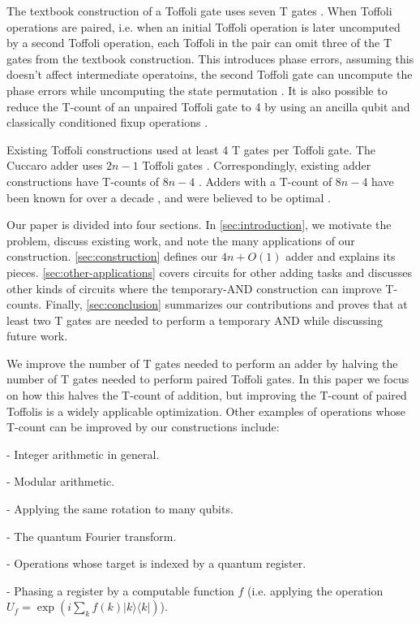 \documentclass[twocolumn,longbibliography]{quantumarticle-customized}
\begin{document}
The textbook construction of a Toffoli gate uses seven T gates \cite{Nielsen2009}.
When Toffoli operations are paired, i.e. when an initial Toffoli operation is later uncomputed by a second Toffoli operation, each Toffoli in the pair can omit three of the T gates from the textbook construction.
This introduces phase errors, assuming this doesn't affect intermediate operatoins, the second Toffoli gate can uncompute the phase errors while uncomputing the state permutation \cite{Barenco1995}.
It is also possible to reduce the T-count of an unpaired Toffoli gate to 4 by using an ancilla qubit and classically conditioned fixup operations \cite{Jones2013}.

Existing Toffoli constructions used at least 4 T gates per Toffoli gate.
The Cuccaro adder uses $2n-1$ Toffoli gates \cite{Cuccaro2004}.
Correspondingly, existing adder constructions have T-counts of $8n-4$ \cite{Amy2013}.
Adders with a T-count of $8n-4$ have been known for over a decade \cite{Barenco1995, Cuccaro2004}, and were believed to be optimal \cite{AustinDiscussionsAndEmails2017}.

Our paper is divided into four sections.
In \autoref{sec:introduction}, we motivate the problem, discuss existing work, and note the many applications of our construction.
\autoref{sec:construction} defines our $4n + O(1)$ adder and explains its pieces.
\autoref{sec:other-applications} covers circuits for other adding tasks and discusses other kinds of circuits where the temporary-AND construction can improve T-counts.
Finally, \autoref{sec:conclusion} summarizes our contributions and proves that at least two T gates are needed to perform a temporary AND while discussing future work.

We improve the number of T gates needed to perform an adder by halving the number of T gates needed to perform paired Toffoli gates.
In this paper we focus on how this halves the T-count of addition, but improving the T-count of paired Toffolis is a widely applicable optimization.
Other examples of operations whose T-count can be improved by our constructions include:

- Integer arithmetic in general.

- Modular arithmetic.

- Applying the same rotation to many qubits.

- The quantum Fourier transform.

- Operations whose target is indexed by a quantum register.

- Phasing a register by a computable function $f$ (i.e. applying the operation $U_f = \exp\left( i \sum_k f(k) |k\rangle \langle k| \right)$).
\end{document}
